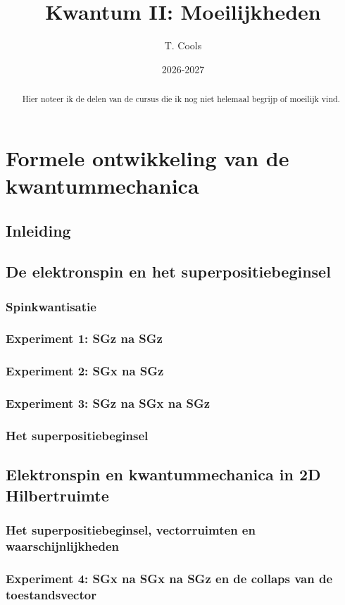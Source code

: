 \documentclass[a4paper,twoside]{article}
\title{Kwantum II: Moeilijkheden}
\author{T. Cools}
\date{2026-2027}
\theoremstyle{definition}
\theoremstyle{plain}
\begin{document}
\maketitle

\begin{abstract}
   Hier noteer ik de delen van de cursus die ik nog niet helemaal begrijp of moeilijk vind.
\end{abstract}

\section{Formele ontwikkeling van de kwantummechanica}
\subsection{Inleiding}
\subsection{De elektronspin en het superpositiebeginsel}
\subsubsection{Spinkwantisatie}
\subsubsection{Experiment 1: SGz na SGz}
\subsubsection{Experiment 2: SGx na SGz}
\subsubsection{Experiment 3: SGz na SGx na SGz}
\subsubsection{Het superpositiebeginsel}
\subsection{Elektronspin en kwantummechanica in 2D Hilbertruimte}
\subsubsection{Het superpositiebeginsel, vectorruimten en waarschijnlijkheden}
\subsubsection{Experiment 4: SGx na SGx na SGz en de collaps van de toestandsvector}
\end{document}
